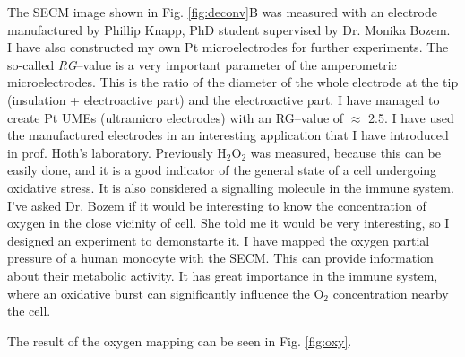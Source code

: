 \documentclass[a4paper, 11pt, oneside, bibliography=totoc]{article}
\begin{document}
The SECM image shown in Fig. \ref{fig:deconv}B was measured with an electrode manufactured by Phillip Knapp, PhD student supervised by Dr. Monika Bozem. I have also constructed my own Pt microelectrodes for further experiments. The so-called \emph{RG}--value is a very important parameter of the amperometric microelectrodes. This is the ratio of the diameter of the whole electrode at the tip (insulation + electroactive part) and the electroactive part. I have managed to create Pt UMEs (ultramicro electrodes) with an RG--value of $\approx$ 2.5. I have used the manufactured electrodes in an interesting application that I have introduced in prof. Hoth's laboratory. Previously H$_2$O$_2$ was measured, because this can be easily done, and it is a good indicator of the general state of a cell undergoing oxidative stress. It is also considered a signalling molecule in the immune system. I've asked Dr. Bozem if it would be interesting to know the concentration of oxygen in the close vicinity of cell. She told me it would be very interesting, so I designed an experiment to demonstarte it. I have mapped the oxygen partial pressure of a human monocyte with the SECM. This can provide information about their metabolic activity. It has great importance in the immune system, where an oxidative burst can significantly influence the O$_2$ concentration nearby the cell. 


The result of the oxygen mapping can be seen in Fig. \ref{fig:oxy}.
\end{document}
